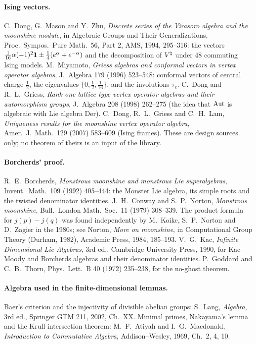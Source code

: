 \paragraph{Ising vectors.}  C.~Dong, G.~Mason and Y.~Zhu, \emph{Discrete series of the Virasoro algebra and the moonshine
module}, in Algebraic Groups and Their Generalizations, Proc.\ Sympos.\ Pure Math.\ 56, Part 2, AMS, 1994, 295--316: the
vectors $\tfrac1{16}\alpha(-1)^2\mathbf 1\pm\tfrac14(e^\alpha+e^{-\alpha})$ and the decomposition of ${V^{\natural}}$ under $48$ commuting Ising
models.  M.~Miyamoto, \emph{Griess algebras and conformal vectors in vertex operator algebras}, J.\ Algebra 179 (1996)
523--548: conformal vectors of central charge $\tfrac12$, the eigenvalues $\{0,\tfrac12,\tfrac1{16}\}$, and the involutions
$\tau_e$.  C.~Dong and R.~L.~Griess, \emph{Rank one lattice type vertex operator algebras and their automorphism groups},
J.\ Algebra 208 (1998) 262--275 (the idea that $\operatorname{Aut}$ is algebraic with Lie algebra $\mathrm{Der}$).  C.~Dong, R.~L.~Griess and
C.~H.~Lam, \emph{Uniqueness results for the moonshine vertex operator algebra}, Amer.\ J.\ Math.\ 129 (2007) 583--609
(Ising frames).  These are design sources only; no theorem of theirs is an input of the library.

\paragraph{Borcherds' proof.}  R.~E.~Borcherds, \emph{Monstrous moonshine and monstrous Lie superalgebras}, Invent.\ Math.\ 109
(1992) 405--444: the Monster Lie algebra, its simple roots and the twisted denominator identities.  J.~H.~Conway and
S.~P.~Norton, \emph{Monstrous moonshine}, Bull.\ London Math.\ Soc.\ 11 (1979) 308--339.  The product formula for $j(p)-j(q)$
was found independently by M.~Koike, S.~P.~Norton and D.~Zagier in the 1980s; see Norton, \emph{More on moonshine}, in
Computational Group Theory (Durham, 1982), Academic Press, 1984, 185--193.  V.~G.~Kac, \emph{Infinite Dimensional Lie
Algebras}, 3rd ed., Cambridge University Press, 1990, for Kac--Moody and Borcherds algebras and their denominator identities.
P.~Goddard and C.~B.~Thorn, Phys.\ Lett.\ B 40 (1972) 235--238, for the no-ghost theorem.

\paragraph{Algebra used in the finite-dimensional lemmas.}  Baer's criterion and the injectivity of divisible abelian groups:
S.~Lang, \emph{Algebra}, 3rd ed., Springer GTM 211, 2002, Ch.~XX.  Minimal primes, Nakayama's lemma and the Krull intersection
theorem: M.~F.~Atiyah and I.~G.~Macdonald, \emph{Introduction to Commutative Algebra}, Addison--Wesley, 1969, Ch.~2, 4, 10.

